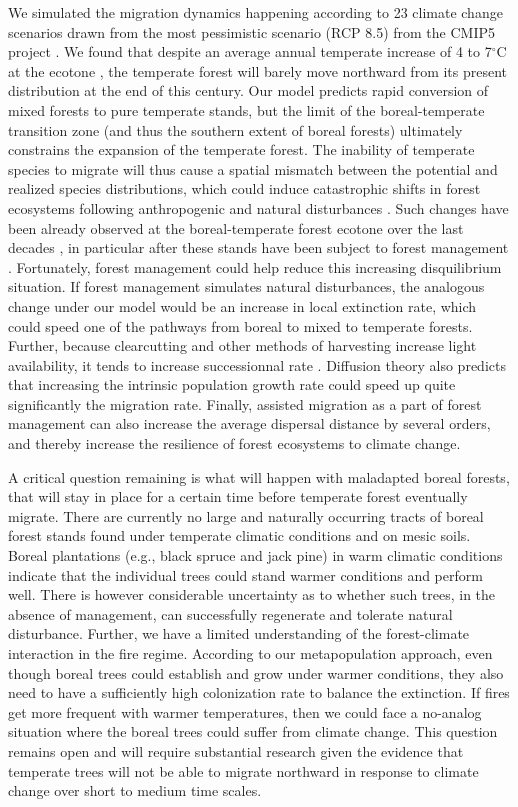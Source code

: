 We simulated the migration dynamics happening according to 23 climate change scenarios drawn from
the most pessimistic scenario (RCP 8.5) from the CMIP5 project \citep{Taylor2012}. We found that
despite an average annual temperate increase of 4 to 7$^{\circ}$C at the ecotone
\citep{Climatique2015}, the temperate forest will barely move northward from its present
distribution at the end of this century.  Our model predicts rapid conversion of mixed forests to
pure temperate stands, but the limit of the boreal-temperate transition zone (and thus the southern
extent of boreal forests) ultimately constrains the expansion of the temperate forest. The inability
of temperate species to migrate will thus cause a spatial mismatch between the potential and
realized species distributions, which could induce catastrophic shifts in forest ecosystems
following anthropogenic and natural disturbances \citep{Walther2002a, Renwick2014, Vanderwel2014}.
Such changes have been already observed at the boreal-temperate forest ecotone over the last decades
\citep{Beckage2008, Talluto2state}, in particular after these stands have been subject to forest
management \citep{Dupuis2011, Boucher2006}. Fortunately, forest management could help reduce this
increasing disquilibrium situation.  If forest management simulates natural disturbances, the
analogous change under our model would be an increase in local extinction rate, which could speed
one of the pathways from boreal to mixed to temperate forests. Further, because clearcutting and
other methods of harvesting increase light availability, it tends to increase successionnal rate
\citep{Abrams1989}. Diffusion theory also predicts that increasing the intrinsic population growth
rate could speed up quite significantly the migration rate. Finally, assisted migration
\citep{Pedlar2012} as a part of forest management can also increase the average dispersal distance
by several orders, and thereby increase the resilience of forest ecosystems to climate change.

A critical question remaining is what will happen with maladapted boreal forests, that will stay in
place for a certain time before temperate forest eventually migrate. There are currently no large
and naturally occurring tracts of boreal forest stands found under temperate climatic conditions and
on mesic soils. Boreal plantations (e.g., black spruce and jack pine) in warm climatic conditions
indicate that the individual trees could stand warmer conditions and perform well. There is however
considerable uncertainty as to whether such trees, in the absence of management, can successfully
regenerate and tolerate natural disturbance. Further, we have a limited understanding of the
forest-climate interaction in the fire regime. According to our metapopulation approach, even though
boreal trees could establish and grow under warmer conditions, they also need to have a sufficiently
high colonization rate to balance the extinction. If fires get more frequent with warmer
temperatures, then we could face a no-analog situation where the boreal trees could suffer from
climate change. This question remains open and will require substantial research given the evidence
that temperate trees will not be able to migrate northward in response to climate change over
short to medium time scales.

